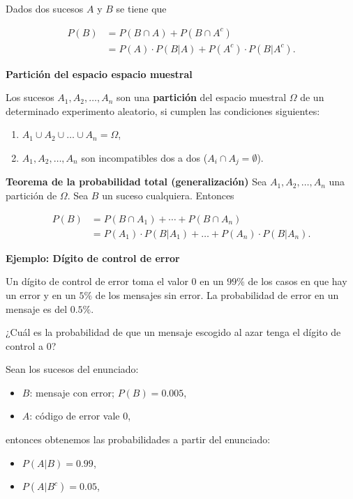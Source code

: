 \documentclass[
  letterpaper,
  DIV=11,
  numbers=noendperiod]{scrreprt}
\providecommand{\tightlist}{%
  \setlength{\itemsep}{0pt}\setlength{\parskip}{0pt}}\usepackage{longtable,booktabs,array}
\begin{document}
Dados dos sucesos \(A\) y \(B\) se tiene que

\[
\begin{array}{rl}
P(B)&= P(B\cap A) +P(B\cap A^c)\\
& =P(A)\cdot P(B|A)+ P(A^c)\cdot P(B|A^c).
\end{array}
\]

\textbf{Partición del espacio espacio muestral}

Los sucesos \(A_1,A_2,\ldots, A_n\) son una \textbf{partición} del
espacio muestral \(\Omega\) de un determinado experimento aleatorio, si
cumplen las condiciones siguientes:

\begin{enumerate}
\def\labelenumi{\arabic{enumi}.}
\tightlist
\item
  \(A_1\cup A_2\cup\ldots\cup A_n=\Omega\),
\item
  \(A_1,A_2,\ldots,A_n\) son incompatibles dos a dos
  (\(A_i\cap A_j=\emptyset\)).
\end{enumerate}

\textbf{Teorema de la probabilidad total (generalización)} Sea
\(A_1,A_2,\ldots,A_n\) una partición de \(\Omega\). Sea \(B\) un suceso
cualquiera. Entonces

\[
\begin{array}{rl}
P(B)&= P(B\cap A_1)+\cdots +P(B\cap A_n)\\
& =P(A_1)\cdot P(B|A_1)+\ldots+P(A_n)\cdot P(B|A_n).
\end{array}
\]

\textbf{Ejemplo: Dígito de control de error}

Un dígito de control de error toma el valor 0 en un \(99\%\) de los
casos en que hay un error y en un \(5\%\) de los mensajes sin error. La
probabilidad de error en un mensaje es del \(0.5\%\).

¿Cuál es la probabilidad de que un mensaje escogido al azar tenga el
dígito de control a 0?

Sean los sucesos del enunciado:

\begin{itemize}
\tightlist
\item
  \(B\): mensaje con error; \(P(B)=0.005\),
\item
  \(A\): código de error vale 0,
\end{itemize}

entonces obtenemos las probabilidades a partir del enunciado:

\begin{itemize}
\tightlist
\item
  \(P(A|B)=0.99\),
\item
  \(P(A|B^c)= 0.05\),
\end{itemize}
\end{document}

